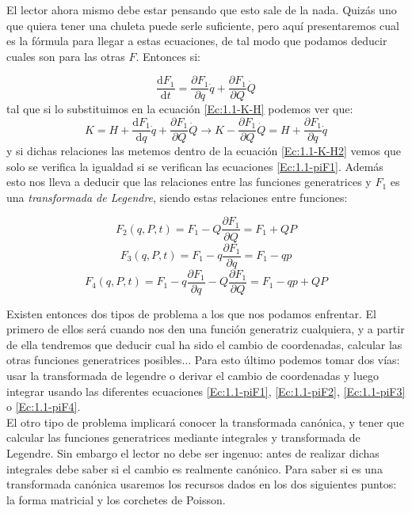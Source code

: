 \documentclass[12pt,a4paper]{article}
\numberwithin{equation}{section}
\numberwithin{figure}{section}
\newcommand{\parciales}[2]{\frac{\partial #1}{\partial #2}}
\newcommand{\D}{\mathrm{d}}
\begin{document}
El lector ahora mismo debe estar pensando que esto sale de la nada. Quizás uno que quiera tener una chuleta puede serle suficiente, pero aquí presentaremos cual es la fórmula para llegar a estas ecuaciones, de tal modo que podamos deducir cuales son para las otras $F$. Entonces si:

\begin{equation}
\dfrac{\D F_1}{\D t} = \dfrac{\partial F_1}{\partial q} \dot{q} + \dfrac{\partial F_1}{\partial Q} \dot{Q} 
\end{equation}
tal que si lo substituimos en la ecuación \ref{Ec:1.1-K-H} podemos ver que:
\begin{equation}
K = H + \dfrac{\D F_1}{\D q} \dot{q} + \dfrac{\partial F_1}{\partial Q} \dot{Q}  \longrightarrow K - \dfrac{\partial F_1}{\partial Q} \dot{Q}  = H + \dfrac{\partial F_1}{\partial q} \dot{q} 
\end{equation}
y si dichas relaciones las metemos dentro de la ecuación \ref{Ec:1.1-K-H2} vemos que solo se verifica la igualdad si se verifican las ecuaciones \ref{Ec:1.1-piF1}. Además esto nos lleva a deducir que las relaciones entre las funciones generatrices y $F_1$ es una \textit{transformada de Legendre}, siendo estas relaciones entre funciones:

\begin{equation}
F_2(q,P,t) = F_1 - Q \parciales{F_1}{Q} = F_1 + QP
\end{equation}
\begin{equation}
F_3(q,P,t) = F_1 - q \parciales{F_1}{q} = F_1 - q p
\end{equation}
\begin{equation}
F_4(q,P,t) = F_1 - q \parciales{F_1}{q} - Q \parciales{F_1}{Q} = F_1 - qp + QP 
\end{equation}

Existen entonces dos tipos de problema a los que nos podamos enfrentar. El primero de ellos será cuando nos den una función generatriz cualquiera, y a partir de ella tendremos que deducir cual ha sido el cambio de coordenadas, calcular las otras funciones generatrices posibles... Para esto último podemos tomar dos vías: usar la transformada de legendre o derivar el cambio de coordenadas y luego integrar usando las diferentes ecuaciones \ref{Ec:1.1-piF1}, \ref{Ec:1.1-piF2}, \ref{Ec:1.1-piF3} o \ref{Ec:1.1-piF4}. \\

El otro tipo de problema implicará conocer la transformada canónica, y tener que calcular las funciones generatrices mediante integrales y transformada de Legendre. Sin embargo el lector no debe ser ingenuo: antes de realizar dichas integrales debe saber si el cambio es realmente canónico. Para saber si es una transformada canónica usaremos los recursos dados en los dos siguientes puntos: la forma matricial y los corchetes de Poisson. 
\end{document}
